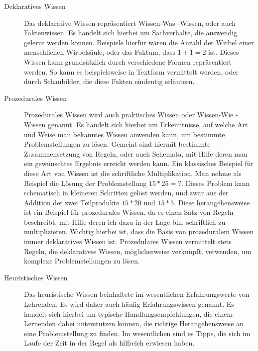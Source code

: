 \begin{description}
	\item[Deklaratives Wissen]
  Das deklarative Wissen repräsentiert \glqq Wissen-Was\grqq{} -Wissen, oder auch Faktenwissen.
	Es handelt sich hierbei um Sachverhalte, die
	auswendig gelernt werden können. Beispiele hierfür wären die Anzahl der Wirbel einer menschlichen Wirbelsäule,
	oder das Faktum, dass \(1+1=2\) ist.
	Dieses Wissen kann grundsätzlich durch verschiedene Formen repräsentiert werden.
	So kann es beispielsweise in Textform vermittelt werden, oder durch Schaubilder,
	die diese Fakten eindeutig erläutern.

	\item[Prozedurales Wissen]
  Prozedurales Wissen wird auch praktisches Wissen oder \glqq Wissen-Wie\grqq{} -Wissen genannt.
	Es handelt sich hierbei um Erkenntnisse, auf welche Art und Weise man bekanntes Wissen anwenden kann,
	um bestimmte Problemstellungen zu lösen.
	Gemeint sind hiermit bestimmte Zusammensetzung von Regeln, oder auch Schemata, mit Hilfe deren man
	ein gewünschtes Ergebnis erreicht werden kann.
	Ein klassisches Beispiel für diese Art von Wissen ist die schriftliche Multiplikation.
	Man nehme als Beispiel die Lösung der Problemstellung \(15*25=?\).
	Dieses Problem kann schematisch in kleineren Schritten gelöst werden, und zwar aus der Addition der
	zwei Teilprodukte \(15*20\) und \(15*5\).
	Diese herangehensweise ist ein Beispiel für prozedurales Wissen, da es einen Satz von Regeln beschreibt,
	mit Hilfe deren ich dazu in der Lage bin, schriftlich zu multiplizieren.
	Wichtig hierbei ist, dass die Basis von prozeduralem Wissen immer deklaratives Wissen ist.
	Prozedulares Wissen vermittelt stets Regeln, die deklaratives Wissen, möglicherweise verknüpft, verwenden,
	um komplexe Problemstellungen zu lösen.

	\item[Heuristisches Wissen]
  Das heuristische Wissen beinhaltete im wesentlichen Erfahrungswerte von Lehrenden.
	Es wird daher auch häufig Erfahrungswissen genannt.
	Es handelt sich hierbei um typische Handlungsempfehlungen, die einem Lernenden
	dabei unterstützen können, die richtige Herangehensweise an eine Problemstellung zu finden.
	Im wesentlichen sind es Tipps, die sich im Laufe der Zeit in der Regel als hilfreich erwiesen haben.
\end{description}

